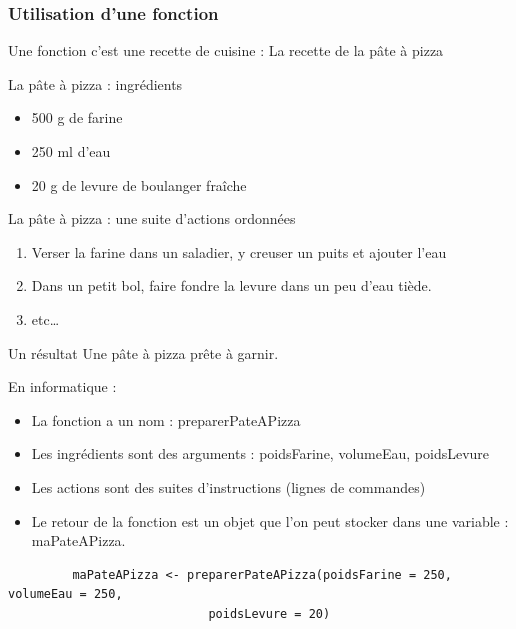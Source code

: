 \documentclass[table,svgnames,hyperref={pdfpagemode=FullScreen}]{beamer}
\begin{document}
\begin{frame}
	\frametitle{Utilisation d'une fonction}
	Une fonction c'est une recette de cuisine : La recette de la pâte à pizza
	\begin{exampleblock}{La pâte à pizza  : ingrédients}
		\begin{itemize}
			\item 500 g de farine
			\item 250 ml d'eau
			\item 20 g de levure de boulanger fraîche
		\end{itemize}
	\end{exampleblock}
\end{frame}
\begin{frame}
	\begin{exampleblock}{La pâte à pizza :  une suite d'actions ordonnées}
		\begin{enumerate}
			\item Verser la farine dans un saladier, y creuser un puits et ajouter l'eau
			\item Dans un petit bol, faire fondre la levure dans un peu d'eau tiède.
			\item etc\dots
		\end{enumerate}
			
	\end{exampleblock}
\end{frame}
\begin{frame}
	\begin{exampleblock}{Un résultat}
		Une pâte à pizza prête à garnir.
	\end{exampleblock}
\end{frame}
\begin{frame}[fragile]
	\begin{exampleblock}{En informatique : }
		\begin{itemize}
			\item La fonction a un nom  : preparerPateAPizza
			\item Les ingrédients sont des arguments : poidsFarine, volumeEau, poidsLevure
			\item Les actions sont des suites d'instructions (lignes de commandes)
			\item Le retour de la fonction est un objet que l'on peut stocker dans une variable : maPateAPizza.
		\end{itemize}
		\begin{lstlisting}
		 maPateAPizza <- preparerPateAPizza(poidsFarine = 250, volumeEau = 250, 
							poidsLevure = 20) 
		 \end{lstlisting}
	\end{exampleblock}
	
\end{frame}
\end{document}
